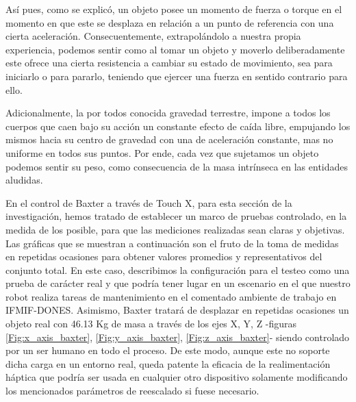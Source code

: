 Así pues, como se explicó, un objeto posee un momento de fuerza o torque en el momento en que este se desplaza en relación a un punto de referencia con una cierta aceleración. Consecuentemente, extrapolándolo a nuestra propia experiencia, podemos sentir como al tomar un objeto y moverlo deliberadamente este ofrece una cierta resistencia a cambiar su estado de movimiento, sea para iniciarlo o para pararlo, teniendo que ejercer una fuerza en sentido contrario para ello.

Adicionalmente, la por todos conocida gravedad terrestre, impone a todos los cuerpos que caen bajo su acción un constante efecto de caída libre, empujando los mismos hacia su centro de gravedad con una de aceleración constante, mas no uniforme en todos sus puntos. Por ende, cada vez que sujetamos un objeto podemos sentir su peso, como consecuencia de la masa intrínseca en las entidades aludidas.

En el control de Baxter a través de Touch X, para esta sección de la investigación, hemos tratado de establecer un marco de pruebas controlado, en la medida de los posible, para que las mediciones realizadas sean claras y objetivas. Las gráficas que se muestran a continuación son el fruto de la toma de medidas en repetidas ocasiones para obtener valores promedios y representativos del conjunto total. En este caso, describimos la configuración para el testeo como una prueba de carácter real y que podría tener lugar en un escenario en el que nuestro robot realiza tareas de mantenimiento en el comentado ambiente de trabajo en IFMIF-DONES. Asimismo, Baxter tratará de desplazar en repetidas ocasiones un objeto real con 46.13 Kg de masa a través de los ejes X, Y, Z -figuras \ref{Fig:x_axis_baxter}, \ref{Fig:y_axis_baxter}, \ref{Fig:z_axis_baxter}- siendo controlado por un ser humano en todo el proceso. De este modo, aunque este no soporte dicha carga en un entorno real, queda patente la eficacia de la realimentación háptica que podría ser usada en cualquier otro dispositivo solamente modificando los mencionados parámetros de reescalado si fuese necesario.  


